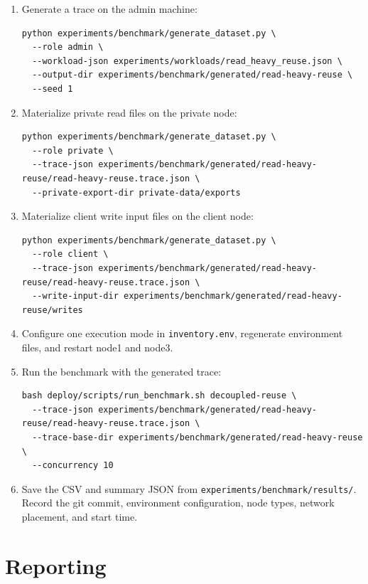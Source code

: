 \documentclass[11pt]{article}
\begin{document}
\begin{enumerate}[leftmargin=*]
  \item Generate a trace on the admin machine:
\begin{verbatim}
python experiments/benchmark/generate_dataset.py \
  --role admin \
  --workload-json experiments/workloads/read_heavy_reuse.json \
  --output-dir experiments/benchmark/generated/read-heavy-reuse \
  --seed 1
\end{verbatim}

  \item Materialize private read files on the private node:
\begin{verbatim}
python experiments/benchmark/generate_dataset.py \
  --role private \
  --trace-json experiments/benchmark/generated/read-heavy-reuse/read-heavy-reuse.trace.json \
  --private-export-dir private-data/exports
\end{verbatim}

  \item Materialize client write input files on the client node:
\begin{verbatim}
python experiments/benchmark/generate_dataset.py \
  --role client \
  --trace-json experiments/benchmark/generated/read-heavy-reuse/read-heavy-reuse.trace.json \
  --write-input-dir experiments/benchmark/generated/read-heavy-reuse/writes
\end{verbatim}

  \item Configure one execution mode in \texttt{inventory.env}, regenerate
  environment files, and restart node1 and node3.

  \item Run the benchmark with the generated trace:
\begin{verbatim}
bash deploy/scripts/run_benchmark.sh decoupled-reuse \
  --trace-json experiments/benchmark/generated/read-heavy-reuse/read-heavy-reuse.trace.json \
  --trace-base-dir experiments/benchmark/generated/read-heavy-reuse \
  --concurrency 10
\end{verbatim}

  \item Save the CSV and summary JSON from
  \texttt{experiments/benchmark/results/}.  Record the git commit, environment
  configuration, node types, network placement, and start time.
\end{enumerate}

\section{Reporting}
\end{document}
